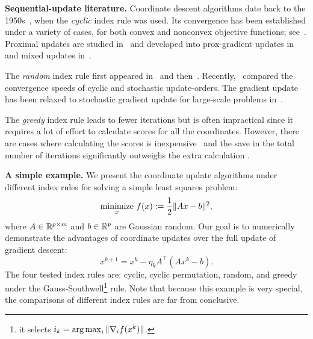 
\textbf{Sequential-update literature.} Coordinate descent algorithms date back to the 1950s~\cite{hildreth1957quadprog}, when the \emph{cyclic} index rule was used. Its convergence has been established under a variety of cases, for both convex and nonconvex objective functions; see~\cite{Warga-63,zadeh1970note, Sargent-Sebastian-73,Han-88,luo1992convergence, Tseng-93, Grippo-Sciandrone-00, Tseng-01, razaviyayn2013unified, beck2013convergence, hong2015iteration, wright2015coordinate}. Proximal updates are studied in~\cite{Grippo-Sciandrone-00, attouch2010proximal} and developed into prox-gradient updates in~\cite{tseng2009_CGD, tseng2009block-linear, bolte2014proximal} and mixed updates in~\cite{XY_2013_multiblock}.

The \emph{random} index rule first appeared in~\cite{nesterov2012cd} and then~\cite{richtarik2014iteration, Lu_Xiao_rbcd_2015}. Recently,~\cite{XY_2014_ecd,Xu2015_APG_NTD} compared the convergence speeds of cyclic and stochastic update-orders. The gradient update has been relaxed to  stochastic gradient update for large-scale problems in~\cite{DangLan-SBMD, XY_2015_bsg}.

The \emph{greedy} index rule leads to fewer iterations but is often impractical since it requires a lot of effort to calculate  scores for all the coordinates. However, there are cases where calculating the scores is inexpensive~\cite{bertsekas1999nonlinear, li2009gcoord, wu2008coordinate} and the save in the total number of iterations significantly outweighs the extra calculation \cite{tseng2009_CGD, dhillon2011nearest, PYY_2013_GRock, schmidt2014coordinate}.

\textbf{A simple example.} We present the coordinate update algorithms under different index rules for solving a simple least squares problem:  %
$$\operatorname*{minimize}_{x}\, f(x):= \frac{1}{2} \|A x - b\|^2,$$
where $A \in \mathbb{R}^{p \times m}$ and $b \in \mathbb{R}^p$ are Gaussian random. Our goal is to numerically demonstrate the advantages of coordinate updates over the  full update of  gradient descent:
$$x^{k+1} = x^k - \eta_k A^{\top}(A x^k - b).$$
The four tested index rules are: cyclic, cyclic permutation, random, and greedy under the Gauss-Southwell\footnote{it selects $i_k=\operatorname*{arg\,max}_i\|\nabla_if(x^k)\|$.} rule.
Note that because this example is very special, the comparisons of different index rules are far from conclusive.

